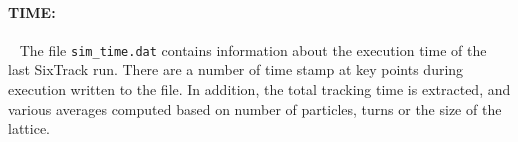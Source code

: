 \paragraph{TIME:}~
The file \texttt{sim\_time.dat} contains information about the execution time of the last SixTrack run.
There are a number of time stamp at key points during execution written to the file.
In addition, the total tracking time is extracted, and various averages computed based on number of particles, turns or the size of the lattice.

